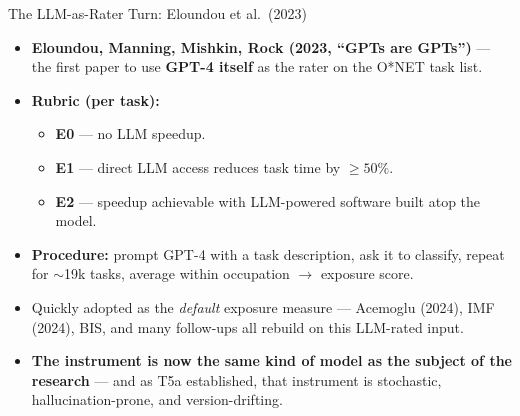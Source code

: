 \begin{frame}{The LLM-as-Rater Turn: Eloundou et al.\ (2023)}
\begin{itemize}
\item \textbf{Eloundou, Manning, Mishkin, Rock (2023, ``GPTs are GPTs'')} --- the first paper to use \textbf{GPT-4 itself} as the rater on the O*NET task list.

\medskip
\item \textbf{Rubric (per task):}
\begin{itemize}
\item \textbf{E0} --- no LLM speedup.
\item \textbf{E1} --- direct LLM access reduces task time by $\ge 50\%$.
\item \textbf{E2} --- speedup achievable with LLM-powered software built atop the model.
\end{itemize}

\medskip
\item \textbf{Procedure:} prompt GPT-4 with a task description, ask it to classify, repeat for $\sim$19k tasks, average within occupation $\to$ exposure score.

\medskip
\item Quickly adopted as the \emph{default} exposure measure --- Acemoglu (2024), IMF (2024), BIS, and many follow-ups all rebuild on this LLM-rated input.

\medskip
\item \textbf{The instrument is now the same kind of model as the subject of the research} --- and as T5a established, that instrument is stochastic, hallucination-prone, and version-drifting.
\end{itemize}
\end{frame}

